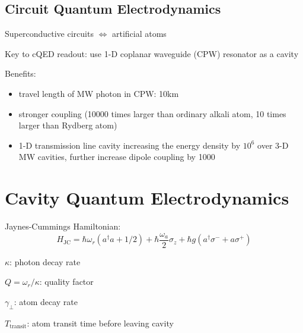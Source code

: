 \documentclass[8pt,a4paper,twocolumn]{article} %
\numberwithin{equation}{section} %
\begin{document}
		\subsection{Circuit Quantum Electrodynamics} %
		\label{sub:circuit_quantum_electrodynamics}
			Superconductive circuits $\Longleftrightarrow $ artificial atoms

			Key to cQED readout: use 1-D coplanar waveguide (CPW) resonator as a cavity

			Benefits:
			\begin{itemize}
				\item travel length of MW photon in CPW: 10km
				\item stronger coupling (10000 times larger than ordinary alkali atom, 10 times larger than Rydberg atom)
				\item 1-D transmission line cavity increasing the energy density by $10^6$ over 3-D MW cavities, further increase dipole coupling by 1000
			\end{itemize}



	\section{Cavity Quantum Electrodynamics} %
	\label{sec:cavity_quantum_electrodynamics}
		Jaynes-Cummings Hamiltonian:
		\begin{equation}
			H_{\text{JC}} = \hbar \omega_r (a^{\dagger}a+1/2)+ \hbar \frac{\omega_a}{2} \sigma_z + \hbar g ( a^{\dagger} \sigma^- + a \sigma^+ )
		\end{equation}

		$\kappa $: photon decay rate

		$ Q=\omega_r/\kappa $: quality factor

		$ \gamma_{\perp} $: atom decay rate

		$T_{\text{transit}}$: atom transit time before leaving cavity

	
\end{document}
